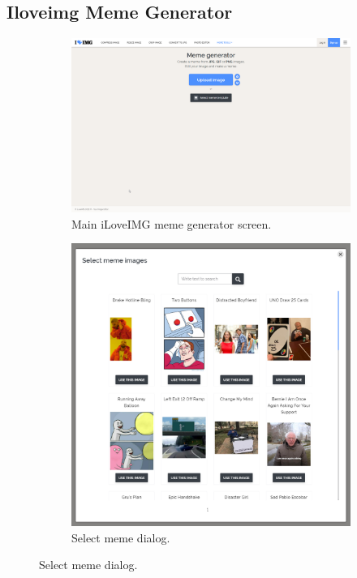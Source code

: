 \subsection{Iloveimg Meme Generator}

\begin{figure}
    \centering
    \begin{subfigure}{\textwidth}
        \centering
        \includegraphics[width=\textwidth]{text/img/iloveimg/main.png}
        \caption{Main iLoveIMG meme generator screen.}
        \label{fig:iloveimg-main}
    \end{subfigure}
    \begin{subfigure}{\textwidth}
        \centering
        \includegraphics[width=\textwidth]{text/img/iloveimg/select-meme-dialog.png}
        \caption{Select meme dialog.}
        \label{fig:iloveimg-select-meme}
    \end{subfigure}
\end{figure}

